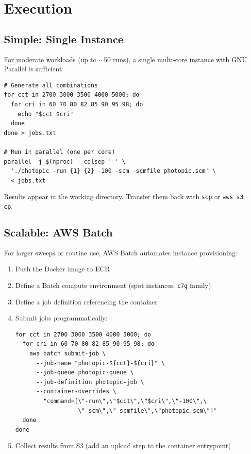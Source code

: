 \documentclass[11pt]{article}
\begin{document}
\section{Execution}

\subsection{Simple: Single Instance}

For moderate workloads (up to $\sim$50 runs), a single multi-core
instance with GNU Parallel is sufficient:

\begin{lstlisting}
# Generate all combinations
for cct in 2700 3000 3500 4000 5000; do
  for cri in 60 70 80 82 85 90 95 98; do
    echo "$cct $cri"
  done
done > jobs.txt

# Run in parallel (one per core)
parallel -j $(nproc) --colsep ' ' \
  './photopic -run {1} {2} -100 -scm -scmfile photopic.scm' \
  < jobs.txt
\end{lstlisting}

Results appear in the working directory.  Transfer them back with
\texttt{scp} or \texttt{aws s3 cp}.

\subsection{Scalable: AWS Batch}

For larger sweeps or routine use, AWS Batch automates instance
provisioning:

\begin{enumerate}
\item Push the Docker image to ECR
\item Define a Batch compute environment (spot instances, \texttt{c7g} family)
\item Define a job definition referencing the container
\item Submit jobs programmatically:
\begin{lstlisting}
for cct in 2700 3000 3500 4000 5000; do
  for cri in 60 70 80 82 85 90 95 98; do
    aws batch submit-job \
      --job-name "photopic-${cct}-${cri}" \
      --job-queue photopic-queue \
      --job-definition photopic-job \
      --container-overrides \
        "command=[\"-run\",\"$cct\",\"$cri\",\"-100\",\
                  \"-scm\",\"-scmfile\",\"photopic.scm\"]"
  done
done
\end{lstlisting}
\item Collect results from S3 (add an upload step to the container entrypoint)
\end{enumerate}
\end{document}
